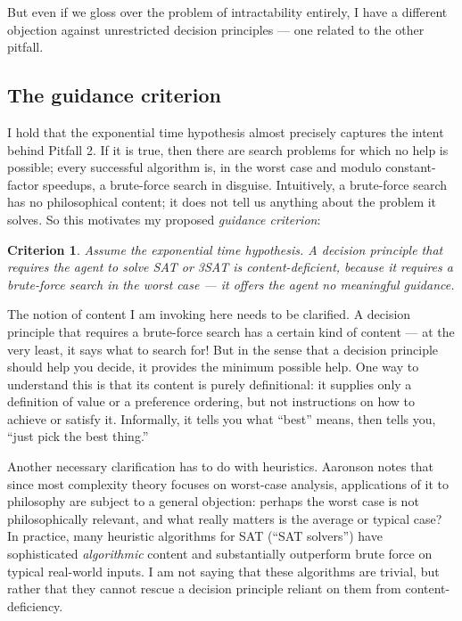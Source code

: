\documentclass[letterpaper,12pt]{article}
\newtheorem{criterion}{Criterion}
\begin{document}
But even if we gloss over the problem of intractability entirely, I have a different objection against unrestricted decision principles --- one related to the other pitfall.

\subsection{The guidance criterion}
\label{guidanceSection}
I hold that the exponential time hypothesis almost precisely captures the intent behind Pitfall 2. If it is true, then there are search problems for which no help is possible; every successful algorithm is, in the worst case and modulo constant-factor speedups, a brute-force search in disguise. Intuitively, a brute-force search has no philosophical content; it does not tell us anything about the problem it solves. So this motivates my proposed \emph{guidance criterion}:

\begin{criterion}
\label{guidance}
Assume the exponential time hypothesis. A decision principle that requires the agent to solve SAT or 3SAT is \emph{content-deficient}, because it requires a brute-force search in the worst case --- it offers the agent no meaningful \emph{guidance}.
\end{criterion}

The notion of content I am invoking here needs to be clarified. A decision principle that requires a brute-force search has a certain kind of content --- at the very least, it says what to search for! But in the sense that a decision principle should help you decide, it provides the minimum possible help. One way to understand this is that its content is purely definitional: it supplies only a definition of value or a preference ordering, but not instructions on how to achieve or satisfy it. Informally, it tells you what ``best'' means, then tells you, ``just pick the best thing.''

Another necessary clarification has to do with heuristics. Aaronson notes that since most complexity theory focuses on worst-case analysis, applications of it to philosophy are subject to a general objection: perhaps the worst case is not philosophically relevant, and what really matters is the average or typical case? In practice, many heuristic algorithms for SAT (``SAT solvers'') have sophisticated \emph{algorithmic} content and substantially outperform brute force on typical real-world inputs. I am not saying that these algorithms are trivial, but rather that they cannot rescue a decision principle reliant on them from content-deficiency.
\end{document}

